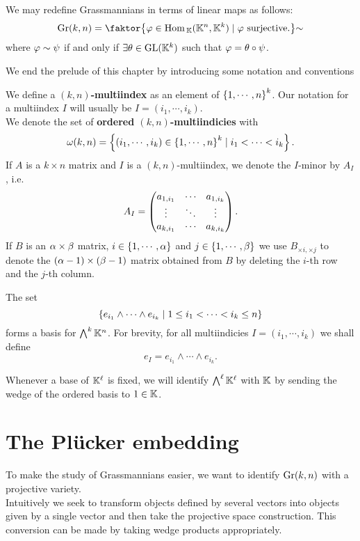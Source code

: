 \begin{corollary}\label{LinearQuotientDefinition}
We may redefine Grassmannians in terms of linear maps as follows:
\[\Gr(k,n)=\quot{\cpa{\vp\in \Hom_\K(\K^n,\K^k)\mid \vp\ \text{surjective.}}}\sim\]
where $\varphi\sim \psi$ if and only if $\exists \theta\in \mathrm{GL}(\mathbb{K}^k)$ such that $\varphi=\theta\circ \psi$.
\end{corollary}

\noindent We end the prelude of this chapter by introducing some notation and conventions
\begin{definition}[Multiindicies]
We define a \textbf{$(k,n)$-multiindex} as an element of $\left\{{1,\cdots, n}\right\}^k$. Our notation for a multiindex $I$ will usually be $I=(i_1,\cdots, i_k)$.\\
We denote the set of \textbf{ordered $(k,n)$-multiindicies} with
\[\omega(k,n)=\left\{{(i_1,\cdots, i_k)\in \left\{{1,\cdots, n}\right\}^k\mid i_1<\cdots<i_k}\right\}.\]
If $A$ is a $k\times n$ matrix and $I$ is a $(k,n)$-multiindex, we denote the $I$-minor by $A_I$, i.e.
\[A_I=\begin{pmatrix}a_{1,i_1} &\cdots &a_{1,i_{k}}\\\vdots &\ddots &\vdots\\a_{k,i_1}&\cdots&a_{k,i_k}\end{pmatrix}.\]
If $B$ is an $\alpha\times \beta$ matrix, $i\in\left\{{1,\cdots, \alpha}\right\}$ and $j\in \left\{{1,\cdots, \beta}\right\}$ we use $B_{\times i,\times j}$ to denote the $(\alpha-1)\times (\beta-1)$ matrix obtained from $B$ by deleting the $i$-th row and the $j$-th column.
\end{definition}

\begin{remark}
The set
\[\left\{{e_{i_1}\wedge\cdots\wedge e_{i_k}\mid 1\leq i_1<\cdots<i_k\leq n}\right\}\]
forms a basis for $\bigwedge^k\mathbb{K}^n$. For brevity, for all multiindicies $I=(i_1,\cdots, i_k)$ we shall define
\[e_I=e_{i_1}\wedge\cdots\wedge e_{i_k}.\]
\end{remark}

\begin{notation}
Whenever a base of $\mathbb{K}^\ell$ is fixed, we will identify $\bigwedge^\ell\mathbb{K}^\ell$ with $\mathbb{K}$ by sending the wedge of the ordered basis to $1\in\mathbb{K}$.
\end{notation}

\section{The Pl\"ucker embedding}
To make the study of Grassmannians easier, we want to identify $\mathrm{Gr}(k,n)$ with a projective variety.\\
Intuitively we seek to transform objects defined by several vectors into objects given by a single vector and then take the projective space construction. This conversion can be made by taking wedge products appropriately.

